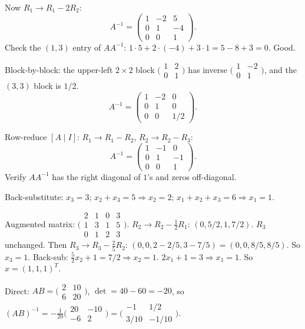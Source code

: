 \begin{solutions}
\[    \]
    Now $R_{1} \to R_{1} - 2 R_{2}$:
    \[
    A^{-1} = \begin{pmatrix} 1 & -2 & 5 \\ 0 & 1 & -4 \\ 0 & 0 & 1 \end{pmatrix}.
    \]
    Check the $(1, 3)$ entry of $A A^{-1}$: $1 \cdot 5 + 2 \cdot (-4) + 3 \cdot 1 = 5 - 8 + 3 = 0$. Good.
    \item Block-by-block: the upper-left $2 \times 2$ block $\bigl(\begin{smallmatrix} 1 & 2 \\ 0 & 1 \end{smallmatrix}\bigr)$ has inverse $\bigl(\begin{smallmatrix} 1 & -2 \\ 0 & 1 \end{smallmatrix}\bigr)$, and the $(3,3)$ block is $1/2$.
    \[
    A^{-1} = \begin{pmatrix} 1 & -2 & 0 \\ 0 & 1 & 0 \\ 0 & 0 & 1/2 \end{pmatrix}.
    \]
    \item Row-reduce $[A \mid I]$: $R_{1} \to R_{1} - R_{2}$, $R_{2} \to R_{2} - R_{3}$:
    \[
    A^{-1} = \begin{pmatrix} 1 & -1 & 0 \\ 0 & 1 & -1 \\ 0 & 0 & 1 \end{pmatrix}.
    \]
    Verify $A A^{-1}$ has the right diagonal of $1$'s and zeros off-diagonal.
    \item Back-substitute: $x_{3} = 3$; $x_{2} + x_{3} = 5 \Rightarrow x_{2} = 2$; $x_{1} + x_{2} + x_{3} = 6 \Rightarrow x_{1} = 1$.
    \item Augmented matrix: $\bigl(\begin{smallmatrix} 2 & 1 & 0 & 3 \\ 1 & 3 & 1 & 5 \\ 0 & 1 & 2 & 3 \end{smallmatrix}\bigr)$. $R_{2} \to R_{2} - \tfrac{1}{2} R_{1}$: $(0, 5/2, 1, 7/2)$. $R_{3}$ unchanged. Then $R_{3} \to R_{3} - \tfrac{2}{5} R_{2}$: $(0, 0, 2 - 2/5, 3 - 7/5) = (0, 0, 8/5, 8/5)$. So $x_{3} = 1$. Back-sub: $\tfrac{5}{2} x_{2} + 1 = 7/2 \Rightarrow x_{2} = 1$. $2 x_{1} + 1 = 3 \Rightarrow x_{1} = 1$. So $x = (1, 1, 1)^{T}$.
    \item Direct: $A B = \bigl(\begin{smallmatrix} 2 & 10 \\ 6 & 20 \end{smallmatrix}\bigr)$, $\det = 40 - 60 = -20$, so $(A B)^{-1} = -\tfrac{1}{20}\bigl(\begin{smallmatrix} 20 & -10 \\ -6 & 2 \end{smallmatrix}\bigr) = \bigl(\begin{smallmatrix} -1 & 1/2 \\ 3/10 & -1/10 \end{smallmatrix}\bigr)$.

\end{solutions}
